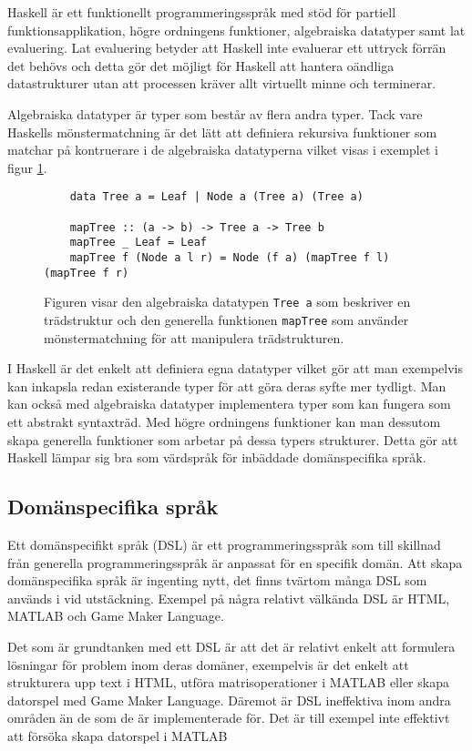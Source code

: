 \documentclass[12pt,a4paper,twoside,openright]{article}
\begin{document}
Haskell är ett funktionellt programmeringsspråk med stöd för partiell
funktionsapplikation, högre ordningens funktioner, algebraiska
datatyper samt lat evaluering. Lat evaluering betyder att Haskell inte
evaluerar ett uttryck förrän det behövs och detta gör det möjligt för
Haskell att hantera oändliga datastrukturer utan att processen kräver
allt virtuellt minne och terminerar.

Algebraiska datatyper är typer som består av flera andra typer. Tack
vare Haskells mönstermatchning är det lätt att definiera rekursiva
funktioner som matchar på kontruerare i de algebraiska datatyperna
vilket visas i exemplet i figur \ref{fig:hask_alg_type}.

\begin{figure}[H]
  \begin{verbatim}
    data Tree a = Leaf | Node a (Tree a) (Tree a)

    mapTree :: (a -> b) -> Tree a -> Tree b
    mapTree _ Leaf = Leaf
    mapTree f (Node a l r) = Node (f a) (mapTree f l) (mapTree f r)
  \end{verbatim}
  \caption{Figuren visar den algebraiska datatypen
    \texttt{Tree a} som beskriver en trädstruktur och den
    generella funktionen \texttt{mapTree} som använder
    mönstermatchning för att manipulera trädstrukturen.}
  \label{fig:hask_alg_type}
\end{figure}

I Haskell är det enkelt att definiera egna datatyper vilket gör att
man exempelvis kan inkapsla redan existerande typer för att göra deras
syfte mer tydligt. Man kan också med algebraiska datatyper
implementera typer som kan fungera som ett abstrakt syntaxträd. Med
högre ordningens funktioner kan man dessutom skapa generella
funktioner som arbetar på dessa typers strukturer. Detta gör att
Haskell lämpar sig bra som värdspråk för inbäddade domänspecifika
språk.

\subsection{Domänspecifika språk}
Ett domänspecifikt språk (\gls{DSL}) är ett programmeringsspråk som
till skillnad från generella programmeringsspråk är anpassat för en
specifik domän. Att skapa domänspecifika språk är ingenting nytt, det
finns tvärtom många DSL som används i vid utstäckning.
Exempel på några relativt välkända DSL är HTML, MATLAB och Game Maker
Language.

Det som är grundtanken med ett DSL är att det är relativt enkelt att
formulera lösningar för problem inom deras domäner, exempelvis är det
enkelt att strukturera upp text i HTML, utföra matrisoperationer i
MATLAB eller skapa datorspel med Game Maker Language. Däremot är DSL
ineffektiva inom andra områden än de som de är implementerade för.
Det är till exempel inte effektivt att försöka skapa datorspel i
MATLAB
\end{document}
